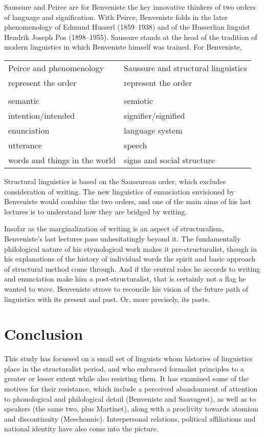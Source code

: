 \documentclass[output=paper]{langscibook}
\begin{document}
Saussure and Peirce are for Benveniste the key innovative thinkers of two orders of language and signification. With Peirce, Benveniste folds in the later phenomenology of Edmund Husserl (1859--1938) and of the Husserlian linguist Hendrik Joseph Pos (1898--1955). Saussure stands at the head of the tradition of modern linguistics in which Benveniste himself was trained. For Benveniste,

\begin{table}
\begin{tabular}{l l}
    Peirce and phenomenology & Saussure and structural linguistics \\
    represent the order & represent the order \\
     & \\
    semantic & semiotic \\
    intention/intended & signifier/signified \\
    enunciation & language system \\
    utterance & speech \\
    words and things in the world & signs and social structure
\end{tabular}
\end{table}

Structural linguistics is based on the Saussurean order, which excludes consideration of writing. The new linguistics of enunciation envisioned by Benveniste would combine the two orders, and one of the main aims of his last lectures is to understand how they are bridged by writing.

Insofar as the marginalization of writing is an aspect of structuralism, Benveniste’s last lectures pass unhesitatingly beyond it. The fundamentally philological nature of his etymological work makes it pre-structuralist, though in his explanations of the history of individual words the spirit and basic approach of structural method come through. And if the central roles he accords to writing and enunciation make him a post-structuralist, that is certainly not a flag he wanted to wave. Benveniste strove to reconcile his vision of the future path of linguistics with its present and past. Or, more precisely, its pasts.

\section{Conclusion}
\label{sec:joseph:conc}

This study has focussed on a small set of linguists whom histories of linguistics place in the structuralist period, and who embraced formalist principles to a greater or lesser extent while also resisting them. It has examined some of the motives for their resistance, which include a perceived abandonment of attention to phonological and philological detail (Benveniste and Sauvageot), as well as to speakers (the same two, plus Martinet), along with a proclivity towards atomism and discontinuity (Meschonnic). Interpersonal relations, political affiliations and national identity have also come into the picture.
\end{document}

